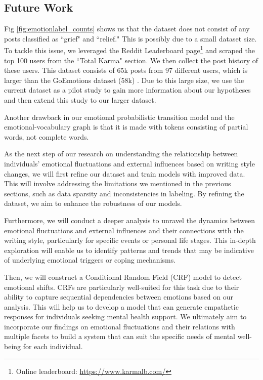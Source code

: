 \documentclass[conference,compsoc]{IEEEtran}
\begin{document}
\subsection{Future Work}

Fig \ref{fig:emotionlabel_counts} shows us that the dataset does not consist of any posts classified as ``grief" and ``relief." This is possibly due to a small dataset size. To tackle this issue, we leveraged the Reddit Leaderboard page\footnote{Online leaderboard: \url{https://www.karmalb.com/}} and scraped the top 100 users from the ``Total Karma" section. We then collect the post history of these users. This dataset consists of 65k posts from 97 different users, which is larger than the GoEmotions dataset (58k) \citep{Demszky+20:GoEmotions}. Due to this large size, we use the current dataset as a pilot study to gain more information about our hypotheses and then extend this study to our larger dataset.


Another drawback in our emotional probabilistic transition model and the emotional-vocabulary graph is that it is made with tokens consisting of partial words, not complete words. 

As the next step of our research on understanding the relationship between individuals' emotional fluctuations and external influences based on writing style changes, we will first refine our dataset and train models with improved data. This will involve addressing the limitations we mentioned in the previous sections, such as data sparsity and inconsistencies in labeling. By refining the dataset, we aim to enhance the robustness of our models.

Furthermore, we will conduct a deeper analysis to unravel the dynamics between emotional fluctuations and external influences and their connections with the writing style, particularly for specific events or personal life stages. This in-depth exploration will enable us to identify patterns and trends that may be indicative of underlying emotional triggers or coping mechanisms.

Then, we will construct a Conditional Random Field (CRF) model to detect emotional shifts. CRFs are particularly well-suited for this task due to their ability to capture sequential dependencies between emotions based on our analysis. This will help us to develop a model that can generate empathetic responses for individuals seeking mental health support. We ultimately aim to incorporate our findings on emotional fluctuations and their relations with multiple facets to build a system that can suit the specific needs of mental well-being for each individual.
\end{document}
